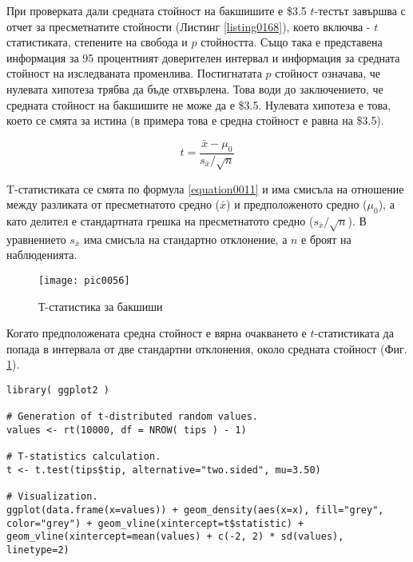 При проверката дали средната стойност на бакшишите е \$3.5 $t$-тестът завършва с отчет за пресметнатите стойности (Листинг \ref{listing0168}), което включва - $t$ статистиката, степените на свобода и $p$ стойността. Също така е представена информация за 95 процентният доверителен интервал и информация за средната стойност на изследваната променлива. Постигнатата $p$ стойност означава, че нулевата хипотеза трябва да бъде отхвърлена. Това води до заключението, че средната стойност на бакшишите не може да е \$3.5. Нулевата хипотеза е това, което се смята за истина (в примера това е средна стойност е равна на \$3.5). 

\begin{equation}
t = \frac{\bar{x}-\mu_0}{s_{\bar{x}}/\sqrt{n}}
\label{equation0011}
\end{equation}

T-статистиката се смята по формула \ref{equation0011} и има смисъла на отношение между разликата от пресметнатото средно ($\bar{x}$) и предположеното средно ($\mu_0$), а като делител е стандартната грешка на пресметнатото средно ($s_{\bar{x}}/\sqrt{n}$). В уравнението $s_{\bar{x}}$ има смисъла на стандартно отклонение, а $n$ е броят на наблюденията. 

\begin{figure}[h!]
  \centering
  \texttt{[image: pic0056]}
  \caption{Т-статистика за бакшиши}
\label{figure0056}
\end{figure}
\FloatBarrier

Когато предположената средна стойност е вярна очакването е $t$-статистиката да попада в интервала от две стандартни отклонения, около средната стойност (Фиг. \ref{figure0056}). 

\begin{lstlisting}[caption=Визуализация на t-разпределение, label=listing0169]
library( ggplot2 )

# Generation of t-distributed random values.
values <- rt(10000, df = NROW( tips ) - 1)

# T-statistics calculation.
t <- t.test(tips$tip, alternative="two.sided", mu=3.50)

# Visualization.
ggplot(data.frame(x=values)) + geom_density(aes(x=x), fill="grey", color="grey") + geom_vline(xintercept=t$statistic) + geom_vline(xintercept=mean(values) + c(-2, 2) * sd(values), linetype=2)
\end{lstlisting}

